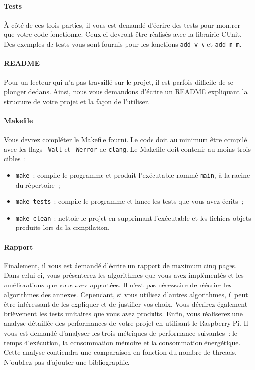 \documentclass[a4paper, 12pt]{article}
\begin{document}
\paragraph{Tests} À côté de ces trois parties, il vous est demandé d'écrire des tests pour montrer que votre code fonctionne. Ceux-ci devront être réalisés avec la librairie CUnit. Des exemples de tests vous sont fournis pour les fonctions \texttt{add\_v\_v} et \texttt{add\_m\_m}.

\paragraph{README} Pour un lecteur qui n'a pas travaillé sur le projet, il est parfois difficile de se plonger dedans. Ainsi, nous vous demandons d'écrire un README expliquant la structure de votre projet et la façon de l'utiliser.

\paragraph{Makefile} Vous devrez compléter le Makefile fourni. Le code doit au minimum être compilé avec les flags \texttt{-Wall} et \texttt{-Werror} de \texttt{clang}. Le Makefile doit contenir au moins trois cibles~:
\begin{itemize}[leftmargin=0cm]
    \item \texttt{make}~: compile le programme et produit l'exécutable nommé \texttt{main}, à la racine du répertoire~;
    \item \texttt{make tests}~: compile le programme et lance les tests que vous avez écrits~;
    \item \texttt{make clean}~: nettoie le projet en supprimant l'exécutable et les fichiers objets produits lors de la compilation.
\end{itemize}

\paragraph{Rapport} Finalement, il vous est demandé d'écrire un rapport de maximum cinq pages. Dans celui-ci, vous présenterez les algorithmes que vous avez implémentés et les améliorations que vous avez apportées. Il n'est pas nécessaire de réécrire les algorithmes des annexes. Cependant, si vous utilisez d'autres algorithmes, il peut être intéressant de les expliquer et de justifier vos choix. Vous décrirez également brièvement les tests unitaires que vous avez produits. Enfin, vous réaliserez une analyse détaillée des performances de votre projet en utilisant le Raspberry Pi. Il vous est demandé d'analyser les trois métriques de performance suivantes~: le temps d'exécution, la consommation mémoire et la consommation énergétique. Cette analyse contiendra une comparaison en fonction du nombre de threads. N'oubliez pas d'ajouter une bibliographie.
\end{document}
